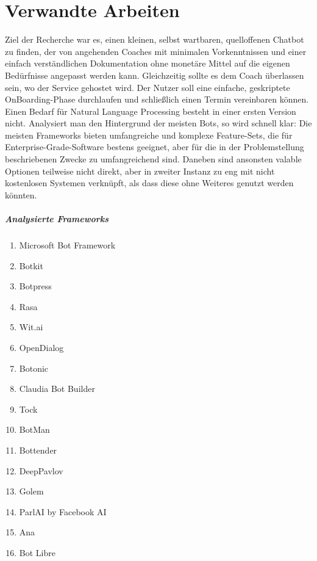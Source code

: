 \label{Verwandte Arbeiten}
\chapter{Verwandte Arbeiten}

    Ziel der Recherche war es, einen kleinen, selbst wartbaren, quelloffenen Chatbot zu finden, der von angehenden Coaches mit minimalen Vorkenntnissen und einer einfach verständlichen Dokumentation ohne monetäre Mittel auf die eigenen Bedürfnisse angepasst werden kann. Gleichzeitig sollte es dem Coach überlassen sein, wo der Service gehostet wird. Der Nutzer soll eine einfache, geskriptete OnBoarding-Phase durchlaufen und schließlich einen Termin vereinbaren können. Einen Bedarf für Natural Language Processing besteht in einer ersten Version nicht. Analysiert man den Hintergrund der meisten Bots, so wird schnell klar: Die meisten Frameworks bieten umfangreiche und komplexe Feature-Sets, die für Enterprise-Grade-Software bestens geeignet, aber für die in der Problemstellung beschriebenen Zwecke zu umfangreichend sind. Daneben sind ansonsten valable Optionen teilweise nicht direkt, aber in zweiter Instanz zu eng mit nicht kostenlosen Systemen verknüpft, als dass diese ohne Weiteres genutzt werden könnten. 

    \paragraph{Analysierte Frameworks}
    \begin{enumerate}
        \item Microsoft Bot Framework
        \item Botkit
        \item Botpress
        \item Rasa
        \item Wit.ai
        \item OpenDialog
        \item Botonic
        \item Claudia Bot Builder
        \item Tock
        \item BotMan
        \item Bottender
        \item DeepPavlov
        \item Golem
        \item ParlAI by Facebook AI
        \item Ana
        \item Bot Libre
    \end{enumerate}


